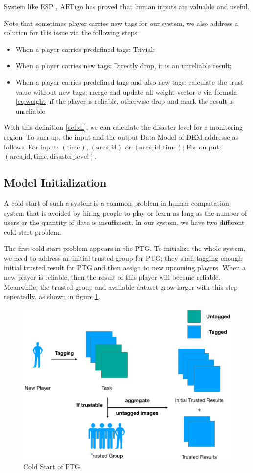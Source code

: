 System like ESP \cite{von2004labeling}, ARTigo \cite{wieser2013artigo} has proved that 
human inputs are valuable and useful.

Note that sometimes player carries new tags for our system, we also address a solution 
for this issue via the following steps:

\begin{itemize}
\item When a player carries predefined tags: Trivial;
\item When a player carries new tags: Directly drop, it is an unreliable result;
\item When a player carries predefined tags and also new tags: calculate the trust value without new tags;
  merge and update all weight vector $v$ via formula \ref{eq:weight} if the player is reliable, 
  otherwise drop and mark the result is unreliable.
\end{itemize}

With this definition \ref{def:dl}, we can calculate the disaster level for a monitoring region.
To sum up, the input and the output Data Model of DEM addresse as follows. For input:
$(\text{time})$, $(\text{area\_id})$ or $(\text{area\_id}, \text{time})$; For output:
$(\text{area\_id}, \text{time}, \text{disaster\_level})$.

\subsection{Model Initialization}
\label{chapter:modelinit}

A cold start of such a system is a common problem in human computation system that 
is avoided by hiring people to play or learn as long as 
the number of users or the quantity of data is insufficient.
In our system, we have two different cold start problem.

The first cold start problem appears in the PTG. To initialize the whole system, we need to
address an initial trusted group for PTG; they shall tagging enough initial trusted result
for PTG and then assign to new upcoming players. When a new player is reliable,
then the result of this player will become reliable. Meanwhile, the trusted group and 
available dataset grow larger with this step repeatedly, as shown in figure \ref{fig:cold}.

\begin{figure}[htp]
\centering
\includegraphics[width=0.5\columnwidth]{figures/coldstart}
\caption{Cold Start of PTG}
\label{fig:cold}
\end{figure}

